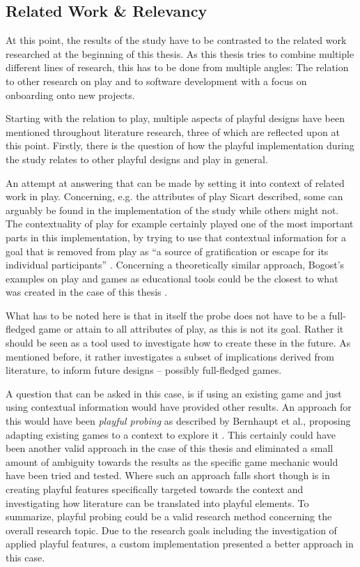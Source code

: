 \subsection{Related Work \& Relevancy}

At this point, the results of the study have to be contrasted to the related work researched at the beginning of this thesis. As this thesis tries to combine multiple different lines of research, this has to be done from multiple angles: The relation to other research on play and to software development with a focus on onboarding onto new projects.

Starting with the relation to play, multiple aspects of playful designs have been mentioned throughout literature research, three of which are reflected upon at this point. Firstly, there is the question of how the playful implementation during the study relates to other playful designs and play in general.

An attempt at answering that can be made by setting it into context of related work in play. Concerning, e.g. the attributes of play Sicart described, some can arguably be found in the implementation of the study while others might not. The contextuality of play for example \cite[p. 6]{sicart2014play} certainly played one of the most important parts in this implementation, by trying to use that contextual information for a goal that is removed from play as \enquote{a source of gratification or escape for its individual participants} \cite[p. 213]{wein2000suttonreview}. Concerning a theoretically similar approach, Bogost's examples on play and games as educational tools could be the closest to what was created in the case of this thesis \cite{bogost2007persuasive}.

What has to be noted here is that in itself the probe does not have to be a full-fledged game or attain to all attributes of play, as this is not its goal. Rather it should be seen as a tool used to investigate how to create these in the future. As mentioned before, it rather investigates a subset of implications derived from literature, to inform future designs -- possibly full-fledged games.

A question that can be asked in this case, is if using an existing game and just using contextual information would have provided other results. An approach for this would have been \textit{playful probing} as described by Bernhaupt et al., proposing adapting existing games to a context to explore it \cite{bernhaupt2007playful}. This certainly could have been another valid approach in the case of this thesis and eliminated a small amount of ambiguity towards the results as the specific game mechanic would have been tried and tested. Where such an approach falls short though is in creating playful features specifically targeted towards the context and investigating how literature can be translated into playful elements. To summarize, playful probing could be a valid research method concerning the overall research topic. Due to the research goals including the investigation of applied playful features, a custom implementation presented a better approach in this case.

